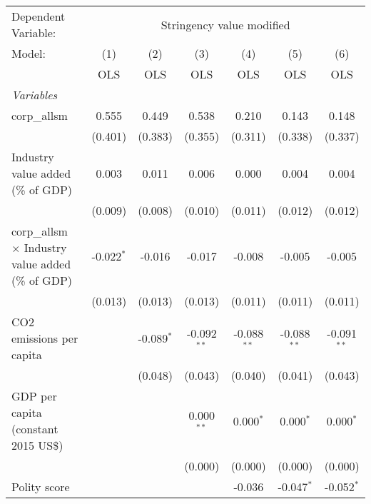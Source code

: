 
\begingroup
\centering
\begin{tabular}{lcccccc}
   \toprule
   Dependent Variable: & \multicolumn{6}{c}{Stringency value modified}\\
   Model:                                                   & (1)          & (2)          & (3)           & (4)           & (5)           & (6)\\  
                                                            &  OLS         & OLS          & OLS           & OLS           & OLS           & OLS\\  
   \midrule
   \emph{Variables}\\
   corp\_allsm                                              & 0.555        & 0.449        & 0.538         & 0.210         & 0.143         & 0.148\\   
                                                            & (0.401)      & (0.383)      & (0.355)       & (0.311)       & (0.338)       & (0.337)\\   
   Industry value added (\% of GDP)                         & 0.003        & 0.011        & 0.006         & 0.000         & 0.004         & 0.004\\   
                                                            & (0.009)      & (0.008)      & (0.010)       & (0.011)       & (0.012)       & (0.012)\\   
   corp\_allsm $\times$ Industry value added (\% of GDP)    & -0.022$^{*}$ & -0.016       & -0.017        & -0.008        & -0.005        & -0.005\\   
                                                            & (0.013)      & (0.013)      & (0.013)       & (0.011)       & (0.011)       & (0.011)\\   
   CO2 emissions per capita                                 &              & -0.089$^{*}$ & -0.092$^{**}$ & -0.088$^{**}$ & -0.088$^{**}$ & -0.091$^{**}$\\   
                                                            &              & (0.048)      & (0.043)       & (0.040)       & (0.041)       & (0.043)\\   
   GDP per capita (constant 2015 US\$)                      &              &              & 0.000$^{**}$  & 0.000$^{*}$   & 0.000$^{*}$   & 0.000$^{*}$\\   
                                                            &              &              & (0.000)       & (0.000)       & (0.000)       & (0.000)\\   
   Polity score                                             &              &              &               & -0.036        & -0.047$^{*}$  & -0.052$^{*}$\\   

\end{tabular}
